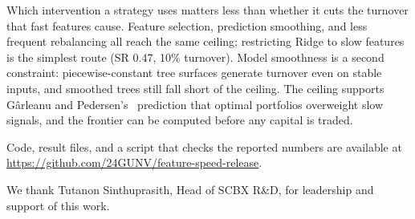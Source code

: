 \documentclass[sigconf,balance=false]{acmart}
\begin{document}
Which intervention a strategy uses matters less than whether it cuts
the turnover that fast features cause. Feature selection, prediction smoothing, and less
frequent rebalancing all reach the same ceiling; restricting Ridge to
slow features is the simplest route (SR 0.47, 10\% turnover). Model
smoothness is a second constraint: piecewise-constant tree surfaces
generate turnover even on stable inputs, and smoothed trees still fall
short of the ceiling. The ceiling supports G\^{a}rleanu and
Pedersen's~\cite{garleanu2013dynamic} prediction that optimal
portfolios overweight slow signals, and the frontier can be computed
before any capital is traded.

Code, result files, and a script that checks the reported numbers are
available at \url{https://github.com/24GUNV/feature-speed-release}.


\begin{acks}
We thank Tutanon Sinthuprasith, Head of SCBX R\&D, for leadership
and support of this work.
\end{acks}




\end{document}
